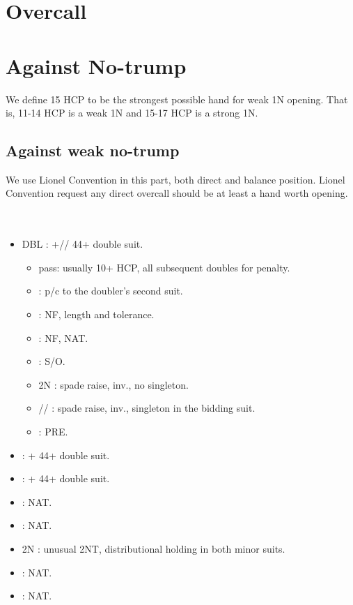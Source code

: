 \documentclass[12pt,twoside,a5paper]{report}%
\begin{document}
\chapter*{Overcall}
\chapter*{Against No-trump}
	We define 15 HCP to be the strongest possible hand for weak 1N opening. That is, 11-14 HCP is a weak 1N and 15-17 HCP is a strong 1N. 
	\section*{Against weak no-trump}
		We use Lionel Convention in this part, both direct and balance position. Lionel Convention request any direct overcall should be at least a hand worth opening.\\
		\\
		\\
		\begin{itemize}
		\renewcommand{\labelitemi}{--}
			\item DBL : \sp{}+\he{}/\di{}/\cl{} 44+ double suit.
				\begin{itemize}
				\renewcommand{\labelitemi}{--}
					\item pass: usually 10+ HCP, all subsequent doubles for penalty.
					\item {} : p/c to the doubler's second suit.
					\item {} : NF, \di{} length and \he{} tolerance.
					\item {} : NF, NAT.
					\item {} : S/O.
					\item 2N : spade raise, inv., no singleton.
					\item {}/\di{}/\he{} : spade raise, inv., singleton in the bidding suit.
					\item {} : PRE.
				\end{itemize}
			\item {} : \he{}+\cl{} 44+ double suit.
			\item {} : \he{}+\di{} 44+ double suit.
			\item {} : NAT.
			\item {} : NAT.
			\item 2N : unusual 2NT, distributional holding in both minor suits.
			\item {} : NAT.
			\item {} : NAT.
		\end{itemize}
		
\end{document}
